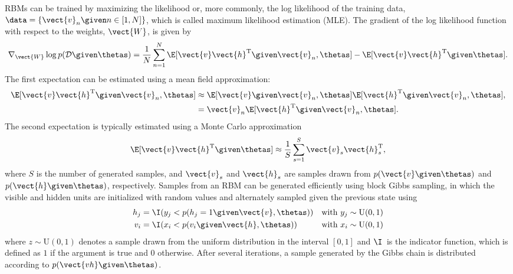 RBMs can be trained by maximizing the likelihood or, more commonly, the log
likelihood of the training data, $\data = \{\vect{v}_n \given n \in [1, N] \}$,
which is called maximum likelihood estimation (MLE). The gradient of the log
likelihood function with respect to the weights, $\vect{W}$, is given by
\begin{equation}
\label{eq:mle}
\nabla_{\vect{W}} \log p(\mathcal{D} \given \thetas) =
\frac{1}{N} \sum_{n = 1}^N
\E[\vect{v}\vect{h}^\text{T} \given \vect{v}_n, \thetas]
-\E[\vect{v}\vect{h}^\text{T} \given \thetas].
\end{equation}
The first expectation can be estimated using a mean field approximation:
\begin{align}
\E[\vect{v}\vect{h}^\text{T} \given \vect{v}_n, \thetas] &\approx
\E[\vect{v} \given \vect{v}_n, \thetas]
\E[\vect{h}^\text{T} \given \vect{v}_n, \thetas], \\
&=\vect{v}_n\E[\vect{h}^\text{T} \given \vect{v}_n, \thetas].
\end{align}
The second expectation is typically estimated using a Monte Carlo
approximation
\begin{equation}
\E[\vect{v}\vect{h}^\text{T} \given \thetas] \approx
\frac{1}{S}\sum_{s=1}^{S}\vect{v}_s\vect{h}_s^\text{T},
\end{equation}
where $S$ is the number of generated samples, and $\vect{v}_s$ and $\vect{h}_s$
are samples drawn from $p(\vect{v}\given \thetas)$ and $p(\vect{h}\given
\thetas)$, respectively. Samples from an RBM can be generated efficiently using
block Gibbs sampling, in which the visible and hidden units are initialized
with random values and alternately sampled given the previous state using
\begin{align}
h_j &= \I(y_j < p(h_j = 1 \given \vect{v}, \thetas)) & \text{with $y_j \sim
\text{U}(0,1)$}\\
v_i &= \I(x_i < p(v_i \given \vect{h}, \thetas)) & \text{with $x_i \sim
\text{U}(0,1)$}
\end{align}
where $z \sim \text{U}(0,1)$ denotes a sample drawn from the uniform
distribution in the interval $[0,1]$ and $\I$~is the indicator function, which
is defined as $1$ if the argument is true and $0$ otherwise. After several
iterations, a sample generated by the Gibbs chain is distributed according to
$p(\vect{vh}\given \thetas)$.

